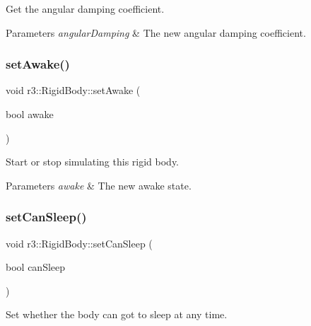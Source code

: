Get the angular damping coefficient. 


\begin{DoxyParams}{Parameters}
{\em angular\+Damping} & The new angular damping coefficient. \\
\hline
\end{DoxyParams}
\mbox{\label{classr3_1_1_rigid_body_acd934e55a7f2f09d91f62ded40ebb325}} 
\subsubsection{\texorpdfstring{set\+Awake()}{setAwake()}}
{\footnotesize\ttfamily void r3\+::\+Rigid\+Body\+::set\+Awake (\begin{DoxyParamCaption}\item[{bool}]{awake }\end{DoxyParamCaption})}



Start or stop simulating this rigid body. 


\begin{DoxyParams}{Parameters}
{\em awake} & The new awake state. \\
\hline
\end{DoxyParams}
\mbox{\label{classr3_1_1_rigid_body_ac630b9cb1a8fbb50356aa46330f5f2a6}} 
\subsubsection{\texorpdfstring{set\+Can\+Sleep()}{setCanSleep()}}
{\footnotesize\ttfamily void r3\+::\+Rigid\+Body\+::set\+Can\+Sleep (\begin{DoxyParamCaption}\item[{bool}]{can\+Sleep }\end{DoxyParamCaption})}



Set whether the body can got to sleep at any time. 

\mbox{\label{classr3_1_1_rigid_body_a96d0738162ca1fe649bab7174e21afd8}} 
